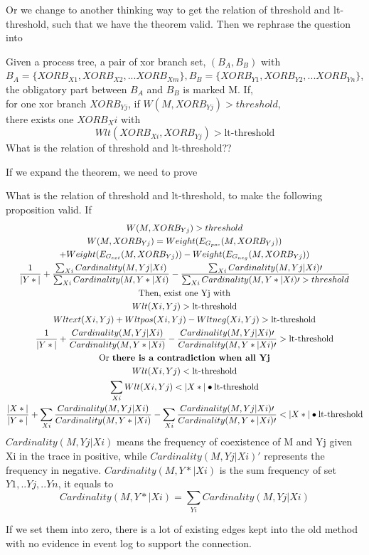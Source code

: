Or we change to another thinking way to get the relation of threshold and lt-threshold, such that we have the theorem valid. Then we rephrase the question into
\begin{proposition}
	Given a process tree, a pair of xor branch set, $(B_A,B_B)$ with $B_A=\{XORB_{X1}, XORB_{X2},...XORB_{Xm}\}, B_B=\{XORB_{Y1}, XORB_{Y2},...XORB_{Yn}\}$, the obligatory part between $B_A$ and $B_B$ is marked M. If,\\
	for one xor branch $XORB_{Yj}$, if $W(M, XORB_{Yj}) > threshold$, \\ there exists one $XORB_Xi$ with 
	\[Wlt(XORB_{Xi}, XORB_{Yj})> \text{lt-threshold}\]
	What is the relation of threshold and lt-threshold?? 
\end{proposition}
If we expand the theorem, we need to prove 
\begin{proposition}
	What is the relation of threshold and lt-threshold, to make the following proposition valid. If 
	\begin{equation*}
		\begin{gathered}
			W(M, XORB_{Yj})  > threshold \\
			W(M, XORB_{Yj}) = Weight(E_{G_{pos}}(M, XORB_{Yj})) \\
			+ Weight(E_{G_{ext}}(M, XORB_{Yj})) 
			- Weight(E_{G_{neg}}(M, XORB_{Yj})) \\
			\frac{1}{|Y*|} + \frac{\sum_{Xi}{Cardinality(M,Yj|Xi)}} {\sum_{Xi}{Cardinality(M,Y*|Xi)}}  
			- \frac{\sum_{Xi}{Cardinality(M,Yj|Xi)\prime}} {\sum_{Xi}{Cardinality(M,Y*|Xi)\prime} > threshold} \\
			\text{Then, exist one Yj with}\\
			Wlt(Xi, Yj)> \text{lt-threshold} \\
			Wlt{ext}(Xi, Yj) + Wlt{pos}(Xi, Yj) -Wlt{neg}(Xi, Yj) > \text{lt-threshold}\\
			\frac{1}{|Y*|} + \frac{Cardinality(M,Yj|Xi)} {Cardinality(M,Y*|Xi)}  
			- \frac{Cardinality(M,Yj|Xi)\prime} {Cardinality(M,Y*|Xi)\prime} > \text{lt-threshold}  \\
			\text{Or \textbf{there is a contradiction when all Yj}}\\
			Wlt(Xi, Yj)< \text{lt-threshold}\\
			\sum_{Xi} Wlt(Xi, Yj) < |X*|\bullet \text{lt-threshold} \\
			\frac{|X*|}{|Y*|} + \sum_{Xi}\frac{Cardinality(M,Yj|Xi)} {Cardinality(M,Y*|Xi)}  
			- \sum_{Xi}\frac{Cardinality(M,Yj|Xi)\prime} {Cardinality(M,Y*|Xi)\prime} < |X*|\bullet \text{lt-threshold}  \\
		\end{gathered}
	\end{equation*}	
	$Cardinality(M,Yj|Xi)$ means the frequency of coexistence of M and Yj given Xi in the trace in positive, while $Cardinality(M,Yj|Xi)\prime$ represents the frequency in negative. $Cardinality(M,Y*|Xi)$ is the sum frequency of set ${Y1,..Yj,..Yn}$, it equals to \[Cardinality(M,Y*|Xi) = \sum_{Yi}Cardinality(M,Yj|Xi)\]
\end{proposition}
If we set them into zero, there is a lot of existing edges kept into the old method with no evidence in event log to support the connection. 

